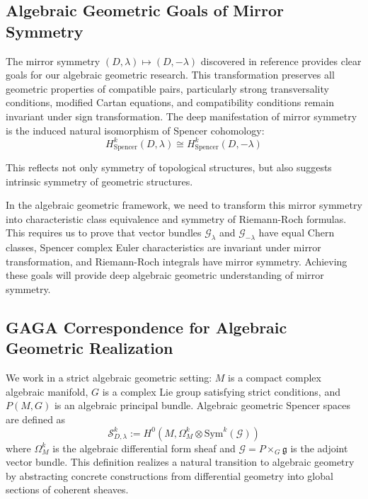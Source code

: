 \documentclass[a4paper,12pt]{extarticle}
\theoremstyle{definition}
\begin{document}
\subsection{Algebraic Geometric Goals of Mirror Symmetry}

The mirror symmetry $(D,\lambda) \mapsto (D,-\lambda)$ discovered in reference\cite{zheng2025mirror} provides clear goals for our algebraic geometric research. This transformation preserves all geometric properties of compatible pairs, particularly strong transversality conditions, modified Cartan equations, and compatibility conditions remain invariant under sign transformation. The deep manifestation of mirror symmetry is the induced natural isomorphism of Spencer cohomology:
\begin{equation}\label{eq:mirror-isomorphism}
H^k_{\mathrm{Spencer}}(D,\lambda) \cong H^k_{\mathrm{Spencer}}(D,-\lambda)
\end{equation}

This reflects not only symmetry of topological structures, but also suggests intrinsic symmetry of geometric structures.

In the algebraic geometric framework, we need to transform this mirror symmetry into characteristic class equivalence and symmetry of Riemann-Roch formulas. This requires us to prove that vector bundles $\mathcal{G}_\lambda$ and $\mathcal{G}_{-\lambda}$ have equal Chern classes, Spencer complex Euler characteristics are invariant under mirror transformation, and Riemann-Roch integrals have mirror symmetry. Achieving these goals will provide deep algebraic geometric understanding of mirror symmetry.

\subsection{GAGA Correspondence for Algebraic Geometric Realization}

We work in a strict algebraic geometric setting: $M$ is a compact complex algebraic manifold, $G$ is a complex Lie group satisfying strict conditions, and $P(M,G)$ is an algebraic principal bundle. Algebraic geometric Spencer spaces are defined as
\begin{equation}\label{eq:alg-spencer-space}
\mathcal{S}^k_{D,\lambda} := H^0(M, \Omega^k_M \otimes \mathrm{Sym}^k(\mathcal{G}))
\end{equation}
where $\Omega^k_M$ is the algebraic differential form sheaf and $\mathcal{G} = P \times_G \mathfrak{g}$ is the adjoint vector bundle. This definition realizes a natural transition to algebraic geometry by abstracting concrete constructions from differential geometry into global sections of coherent sheaves.
\end{document}

